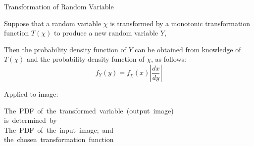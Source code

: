%
%
\begin{slide}{Transformation of Random Variable}
\begin{titlelist}{}{}

\item<2-> 
Suppose that a random variable $\chi$ is transformed by a monotonic transformation function $T(\chi)$ to produce a new random variable $Y$, 

\item<3-> 
Then the probability density function of $Y$ can be obtained from knowledge of $T(\chi)$ and the probability density function of $\chi$, as follows:
\vspace{-2ex}
\[ f_{Y}(y) = f_{\chi}(x) \left| \dfrac{dx}{dy} \right| \]

\item<4-> Applied to image:


\begin{center}
\mbox{The PDF of the transformed variable (output image)}\\
\mbox{is determined by}\\
\mbox{The PDF of the input image; and}\\
\mbox{the chosen transformation function}
\end{center}

\end{titlelist}

\end{slide}

